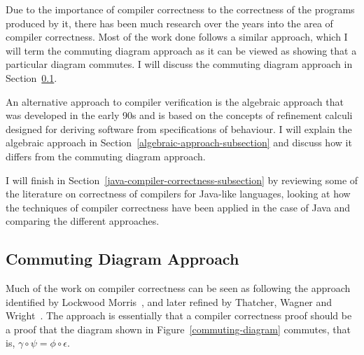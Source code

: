 \documentclass[a4paper,10pt]{report}
\begin{document}
Due to the importance of compiler correctness to the correctness of the programs
produced by it, there has been much research over the years into the area of
compiler correctness. Most of the work done follows a similar approach, which I
will term the commuting diagram approach as it can be viewed as showing that a
particular diagram commutes. I will discuss the commuting diagram approach in
Section~\ref{commuting-diagram-subsection}.

An alternative approach to compiler verification is the algebraic approach that
was developed in the early 90s and is based on the concepts of refinement
calculi designed for deriving software from specifications of behaviour. I will
explain the algebraic approach in Section~\ref{algebraic-approach-subsection}
and discuss how it differs from the commuting diagram approach.

I will finish in Section~\ref{java-compiler-correctness-subsection} by reviewing
some of the literature on correctness of compilers for Java-like languages,
looking at how the techniques of compiler correctness have been applied in the
case of Java and comparing the different approaches.

\subsection{Commuting Diagram Approach}
\label{commuting-diagram-subsection}

Much of the work on compiler correctness can be seen as following the approach
identified by Lockwood Morris~\cite{morris1973}, and later refined by Thatcher,
Wagner and Wright~\cite{thatcher1979}. The approach is essentially that a
compiler correctness proof should be a proof that the diagram shown in
Figure~\ref{commuting-diagram} commutes, that is, $\gamma \circ \psi = \phi
\circ \epsilon$.
\end{document}
